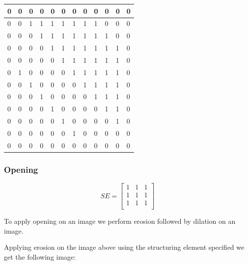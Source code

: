 \documentclass[12pt, letterpaper]{article}
\begin{document}
\begin{table}[H]
    \centering
    \begin{tabular}{|l|l|l|l|l|l|l|l|l|l|l|l|}
    \hline
     0 & 0 & 0 & 0 & 0 & 0 & 0 & 0 & 0 & 0 & 0 & 0 \\ \hline
     0 & 0 & 1 & 1 & 1 & 1 & 1 & 1 & 1 & 0 & 0 & 0 \\ \hline
     0 & 0 & 0 & 1 & 1 & 1 & 1 & 1 & 1 & 1 & 0 & 0 \\ \hline
     0 & 0 & 0 & 0 & 1 & 1 & 1 & 1 & 1 & 1 & 1 & 0 \\ \hline
     0 & 0 & 0 & 0 & 0 & 1 & 1 & 1 & 1 & 1 & 1 & 0 \\ \hline
     0 & 1 & 0 & 0 & 0 & 0 & 1 & 1 & 1 & 1 & 1 & 0 \\ \hline
     0 & 0 & 1 & 0 & 0 & 0 & 0 & 1 & 1 & 1 & 1 & 0 \\ \hline
     0 & 0 & 0 & 1 & 0 & 0 & 0 & 0 & 1 & 1 & 1 & 0 \\ \hline
     0 & 0 & 0 & 0 & 1 & 0 & 0 & 0 & 0 & 1 & 1 & 0 \\ \hline
     0 & 0 & 0 & 0 & 0 & 1 & 0 & 0 & 0 & 0 & 1 & 0 \\ \hline
     0 & 0 & 0 & 0 & 0 & 0 & 1 & 0 & 0 & 0 & 0 & 0 \\ \hline
     0 & 0 & 0 & 0 & 0 & 0 & 0 & 0 & 0 & 0 & 0 & 0 \\ \hline
    \end{tabular}
\end{table}

\subsubsection{Opening}

\[ SE = \begin{bmatrix}1&1&1\\1&1&1\\1&1&1\\ \end{bmatrix} \]

To apply opening on an image we perform erosion followed by dilation on an image.

Applying erosion on the image above using the structuring element specified we get the following image:
\end{document}
